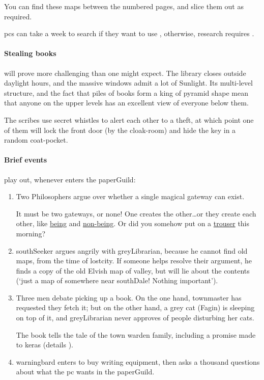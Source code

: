 \begin{multicols}{2}
You can find these maps between the numbered pages, and slice them out as required.

\Glspl{pc} can take a week to search if they want to use , otherwise, research requires .

\paragraph{Stealing books}
will prove more challenging than one might expect.
The library closes outside daylight hours, and the massive windows admit a lot of Sunlight.
Its multi-level structure, and the fact that piles of books form a king of pyramid shape mean that anyone on the upper levels has an excellent view of everyone below them.

The \glspl{scribe} use secret whistles to alert each other to a theft, at which point one of them will lock the front door (by the cloak-room) and hide the key in a random coat-pocket.

\paragraph{Brief events}
play out, whenever  enters the \gls{paperGuild}:

\begin{enumerate}
  \item
  Two Philosophers argue over whether a single magical gateway can exist.
  \begin{speechtext}
    It must be two gateways, or none!
    One creates the other\ldots or they create each other, like \underline{being} and \underline{non-being}.
    Or did you somehow put on a \underline{trouser} this morning?
  \end{speechtext}
  \item
  \Gls{southSeeker} argues angrily with \gls{greyLibrarian}, because he cannot find old maps, from the time of \gls{lostcity}.
  If someone helps resolve their argument, he finds a copy of the old Elvish map of \gls{valley}, but will lie about the contents (`just a map of somewhere near \gls{southDale}! Nothing important').
  \item
  Three men debate picking up a book.
  On the one hand, \gls{townmaster} has requested they fetch it; but on the other hand, a grey cat (Fagin) is sleeping on top of it, and \gls{greyLibrarian} never approves of people disturbing her cats.

  The book tells the tale of the \gls{town} \gls{warden} family, including a promise made to \gls{keras} (details ).
  \item
  \Gls{warningbard} enters to buy writing equipment, then asks a thousand questions about what the \gls{pc} wants in the \gls{paperGuild}.
\end{enumerate}


\end{multicols}
